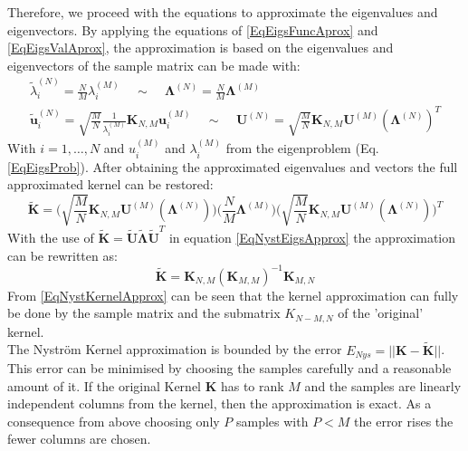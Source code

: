 Therefore, we proceed with the equations to approximate the eigenvalues and eigenvectors.
By applying the equations of \eqref{EqEigsFuncAprox} and \eqref{EqEigsValAprox}, the approximation is based on the eigenvalues and eigenvectors of the sample matrix can be made with:\cite{Zhang.2008}
\begin{equation}\label{EqNystEigsApprox}
	\begin{gathered}
			\tilde{\lambda}_i^{(N)} = \frac{N}{M}\lambda_i^{(M)} \>\>\>\>\> \sim \>\>\>\>\> \boldsymbol{\Lambda}^{(N)} =\frac{N}{M}\boldsymbol{\Lambda}^{(M)}\\
			\tilde{\mathbf{u}}_i^{(N)} = \sqrt{\frac{M}{N}}\frac{1}{\lambda_i^{(M)}}\mathbf{K}_{N,M}\mathbf{u}_i^{(M)}\>\>\>\>\> \sim \>\>\>\>\> \mathbf{U}^{(N)} = \sqrt{\frac{M}{N}}\mathbf{K}_{N,M}\mathbf{U}^{(M)}(\boldsymbol{\Lambda}^{(N)})^T
	\end{gathered}
\end{equation}
With $i=1,\dots,N$ and $u_i^{(M)}$ and $\lambda_i^{(M)}$ from the eigenproblem (Eq. \eqref{EqEigsProb}).
After obtaining the approximated eigenvalues and vectors the full approximated kernel can be restored:\cite{Williams.2000}\cite{Zhang.2008}
\begin{equation}\label{EqNystKernelEigsApprox}
	\tilde{\mathbf{K}} = \bigg(\sqrt{\frac{M}{N}}\mathbf{K}_{N,M}\mathbf{U}^{(M)}(\boldsymbol{\Lambda}^{(N)})\bigg)\bigg(\frac{N}{M}\boldsymbol{\Lambda}^{(M)}\bigg)\bigg(\sqrt{\frac{M}{N}}\mathbf{K}_{N,M}\mathbf{U}^{(M)}(\boldsymbol{\Lambda}^{(N)})\bigg)^T 
\end{equation}
With the use of $\tilde{\mathbf{K}} = \tilde{\mathbf{U}}\tilde{\mathbf{\Lambda}}\tilde{\mathbf{U}}^T$ in equation \eqref{EqNystEigsApprox} the approximation can be rewritten as:
\begin{equation}\label{EqNystKernelApprox}
		\tilde{\mathbf{K}} = \mathbf{K}_{N,M}(\mathbf{K}_{M,M})^{-1}\mathbf{K}_{M,N}
\end{equation}
From \eqref{EqNystKernelApprox} can be seen that the kernel approximation can fully be done by the sample matrix and the submatrix $K_{N-M, N}$ of the 'original' kernel.\cite{Williams.2000}\\
The Nyström Kernel approximation is bounded by the error  $E_{Nys}=||\mathbf{K}-\tilde{\mathbf{K}}||$.\cite{He.2017}
This error can be minimised by choosing the samples carefully and a reasonable amount of it.
If the original Kernel $\mathbf{K}$ has to rank $M$ and the samples are linearly independent columns from the kernel, then the approximation is exact.
As a consequence from above choosing only $P$ samples with $P< M$ the error rises the fewer columns are chosen.\cite{Williams.2000}\\
